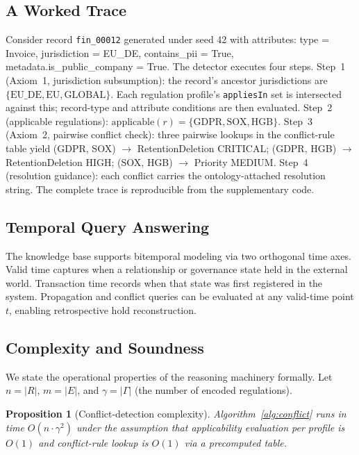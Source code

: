 \documentclass{ieeeaccess}
\newtheorem{proposition}{Proposition}
\begin{document}
\subsection{A Worked Trace}

Consider record \texttt{fin\_00012} generated under seed 42 with attributes: type = Invoice, jurisdiction = EU\_DE, contains\_pii = True, metadata.is\_public\_company = True. The detector executes four steps. Step~1 (Axiom~1, jurisdiction subsumption): the record's ancestor jurisdictions are $\{\mathrm{EU\_DE, EU, GLOBAL}\}$. Each regulation profile's \texttt{appliesIn} set is intersected against this; record-type and attribute conditions are then evaluated. Step~2 (applicable regulations): $\mathrm{applicable}(r) = \{\mathrm{GDPR, SOX, HGB}\}$. Step~3 (Axiom~2, pairwise conflict check): three pairwise lookups in the conflict-rule table yield (GDPR, SOX) $\rightarrow$ RetentionDeletion CRITICAL; (GDPR, HGB) $\rightarrow$ RetentionDeletion HIGH; (SOX, HGB) $\rightarrow$ Priority MEDIUM. Step~4 (resolution guidance): each conflict carries the ontology-attached resolution string. The complete trace is reproducible from the supplementary code.

\subsection{Temporal Query Answering}

The knowledge base supports bitemporal modeling via two orthogonal time axes. Valid time captures when a relationship or governance state held in the external world. Transaction time records when that state was first registered in the system. Propagation and conflict queries can be evaluated at any valid-time point $t$, enabling retrospective hold reconstruction.

\subsection{Complexity and Soundness}

We state the operational properties of the reasoning machinery formally. Let $n = |R|$, $m = |E|$, and $\gamma = |\Gamma|$ (the number of encoded regulations).

\begin{proposition}[Conflict-detection complexity]
Algorithm~\ref{alg:conflict} runs in time $O(n \cdot \gamma^2)$ under the assumption that applicability evaluation per profile is $O(1)$ and conflict-rule lookup is $O(1)$ via a precomputed table.
\end{proposition}
\end{document}
